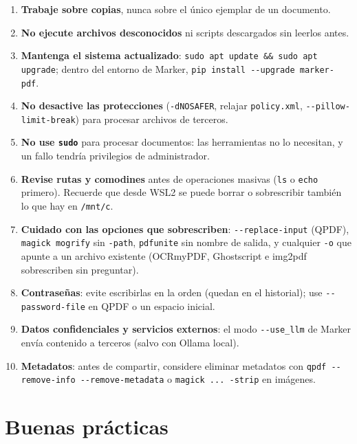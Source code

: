 \documentclass[11pt,a4paper]{article}
\newcommand{\cmd}[1]{\texttt{\textcolor{colcmd}{#1}}}      %
\newcommand{\opt}[1]{\texttt{\textcolor{colopt}{#1}}}      %
\newcommand{\arch}[1]{\texttt{\textcolor{colarch}{#1}}}    %
\begin{document}
	\begin{enumerate}
		\item \textbf{Trabaje sobre copias}, nunca sobre el único ejemplar de un documento.
		\item \textbf{No ejecute archivos desconocidos} ni scripts descargados sin leerlos antes.
		\item \textbf{Mantenga el sistema actualizado}: \cmd{sudo apt update \&\& sudo apt upgrade}; dentro del entorno de Marker, \cmd{pip install -{}-upgrade marker-\allowbreak{}pdf}.
		\item \textbf{No desactive las protecciones} (\opt{-dNOSAFER}, relajar \arch{policy.xml}, \opt{-{}-pillow-\allowbreak{}limit-\allowbreak{}break}) para procesar archivos de terceros.
		\item \textbf{No use \cmd{sudo}} para procesar documentos: las herramientas no lo necesitan, y un fallo tendría privilegios de administrador.
		\item \textbf{Revise rutas y comodines} antes de operaciones masivas (\cmd{ls} o \cmd{echo} primero). Recuerde que desde WSL2 se puede borrar o sobrescribir también lo que hay en \arch{/mnt/c}.
		\item \textbf{Cuidado con las opciones que sobrescriben}: \opt{-{}-replace-\allowbreak{}input} (QPDF), \cmd{magick mogrify} sin \opt{-path}, \cmd{pdfunite} sin nombre de salida, y cualquier \opt{-o} que apunte a un archivo existente (OCRmyPDF, Ghostscript e img2pdf sobrescriben sin preguntar).
		\item \textbf{Contraseñas}: evite escribirlas en la orden (quedan en el historial); use \opt{-{}-password-\allowbreak{}file} en QPDF o un espacio inicial.
		\item \textbf{Datos confidenciales y servicios externos}: el modo \opt{-{}-use\_llm} de Marker envía contenido a terceros (salvo con Ollama local).
		\item \textbf{Metadatos}: antes de compartir, considere eliminar metadatos con \cmd{qpdf -{}-remove-\allowbreak{}info -{}-remove-\allowbreak{}metadata} o \cmd{magick ... -strip} en imágenes.
	\end{enumerate}
	
	\clearpage
	\section{Buenas prácticas}\label{sec:buenas}
	
\end{document}
